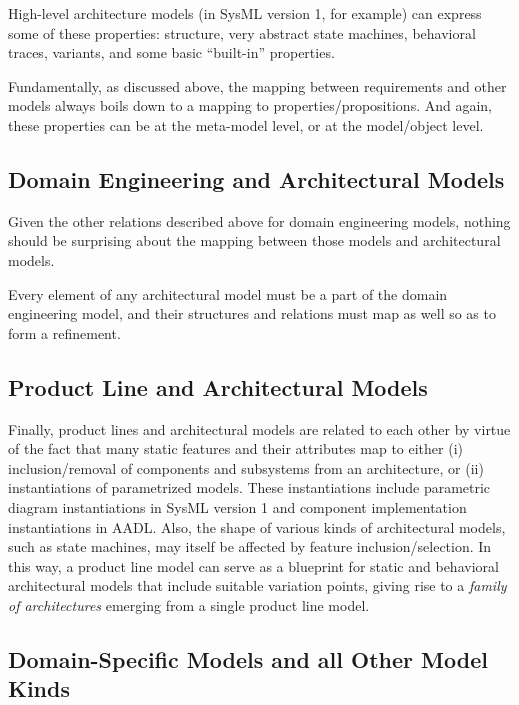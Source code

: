 \documentclass[10pt,letterpaper]{article}
\begin{document}
High-level architecture models (in SysML version 1, for example) can express some of these properties: structure, very abstract state machines, behavioral traces, variants, and some basic ``built-in'' properties.

Fundamentally, as discussed above, the mapping between requirements and other models always boils down to a mapping to properties/propositions. And again, these properties can be at the meta-model level, or at the model/object level.

\subsection{Domain Engineering and Architectural Models}
\label{domain-engineering-and-architectural-models}

Given the other relations described above for domain engineering models, nothing should be surprising about the mapping between those models and architectural models.

Every element of any architectural model must be a part of the domain engineering model, and their structures and relations must map as well so as to form a refinement.

\subsection{Product Line and Architectural Models}
\label{product-line-and-architectural-models}

Finally, product lines and architectural models are related to each other by virtue of the fact that many static features and their attributes map to either (i) inclusion/removal of components and subsystems from an architecture, or (ii) instantiations of parametrized models. These instantiations include parametric diagram instantiations in SysML version 1 and component implementation instantiations in AADL. Also, the shape of various kinds of architectural models, such as state machines, may itself be affected by feature inclusion/selection. In this way, a product line model can serve as a blueprint for static and behavioral architectural models that include suitable variation points, giving rise to a \emph{family of architectures} emerging from a single product line model.

\subsection{Domain-Specific Models and all Other Model Kinds}
\label{domain-specific-models-and-all-other-model-kinds}
\end{document}
